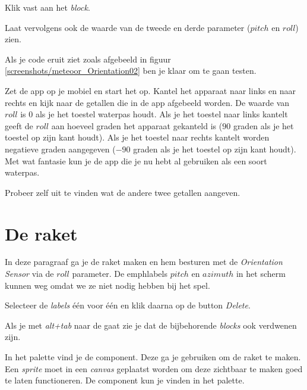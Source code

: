 \begin{opgave}
    \opgVraag
  Klik  vast aan het  \emph{block}.
  
	Laat vervolgens ook de waarde van de tweede en derde parameter ($pitch$ en $roll$) zien.
\end{opgave}

Als je code eruit ziet zoals afgebeeld in figuur \ref{screenshots/meteoor_Orientation02} ben je klaar om te gaan testen.

\runOpTelefoon{}
Zet de app op je mobiel en start het op. Kantel het apparaat naar links en naar rechts en kijk naar de getallen die in de app afgebeeld worden. De waarde van $roll$ is $0$ als je het toestel waterpas houdt. Als je het toestel naar links kantelt geeft de $roll$ aan hoeveel graden het apparaat gekanteld is ($90$ graden als je het toestel op zijn kant houdt). Als je het toestel naar rechts kantelt worden negatieve graden aangegeven ($-90$ graden als je het toestel op zijn kant houdt). Met wat fantasie kun je de app die je nu hebt al gebruiken als een soort waterpas.


\begin{opgave}
    \opgVraag
	Probeer zelf uit te vinden wat de andere twee getallen aangeven.
\end{opgave}

\section{De raket}
In deze paragraaf ga je de raket maken en hem besturen met de \emph{Orientation Sensor} via de $roll$ parameter. De emph{labels} $pitch$ en $azimuth$ in het  scherm kunnen weg omdat we ze niet nodig hebben bij het spel.

\begin{opgave}
    \opgVraag
  Selecteer de \emph{labels} \'e\'en voor \'e\'en en klik daarna op de button \emph{Delete}.

  Als je met \emph{alt+tab} naar de  gaat zie je dat de bijbehorende \emph{blocks} ook verdwenen zijn. 
\end{opgave}

In het  palette vind je de  component. Deze ga je gebruiken om de raket te maken. Een \emph{sprite} moet in een \emph{canvas} geplaatst worden om deze zichtbaar te maken goed te laten functioneren. De  component kun je vinden in het  palette.

